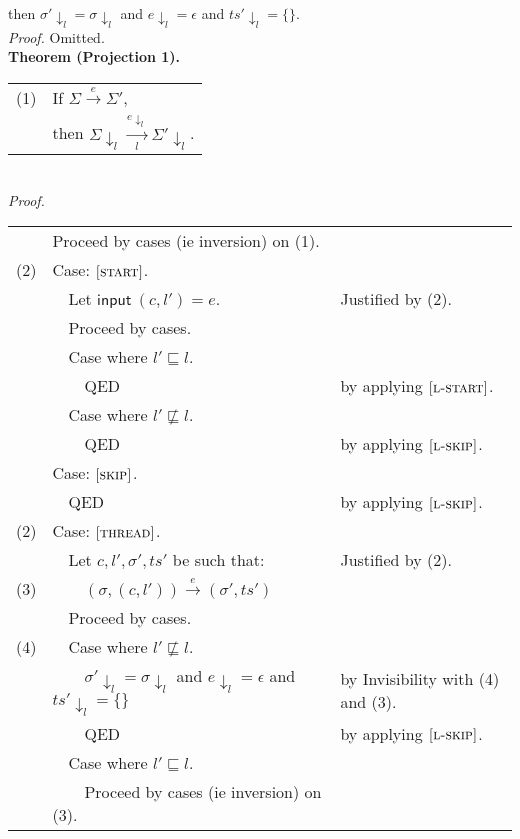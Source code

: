 \documentclass{article}
\newcommand{\rn}[1]{\text{\textsc{[#1]}}}
\newcommand{\tsteparrow}[1]{\overset{#1}{\longrightarrow}}
\newcommand{\tstep}[3]{#2\tsteparrow{#1}#3}
\newcommand{\ssteparrow}[1]{\overset{#1}{\longrightarrow}}
\newcommand{\sstep}[3]{#2\ssteparrow{#1}#3}
\newcommand{\lssteparrow}[2]{\overset{#2}{\underset{#1}{\longrightarrow}}}
\newcommand{\lsstep}[4]{#3\lssteparrow{#1}{#2}#4}
\newcommand{\thread}[2]{(#1,#2)}
\newcommand{\evstart}[1]{\textsf{input}~#1}
\newcommand{\proj}[2]{#1{\downarrow_{#2}}}
\begin{document}
\\
then $\proj{\sigma'}{l}=\proj{\sigma}{l}$
and $\proj{e}{l}=\epsilon$
and $\proj{ts'}{l}=\{\}$.
\\
\textit{Proof.}
Omitted.
\\
\textbf{Theorem (Projection 1).}
\\
\begin{tabular}{l@{$\qquad$}l}
  (1) & If $\sstep{e}{\Sigma}{\Sigma'}$,
\\
      & then $\lsstep{l}{\proj{e}{l}}{\proj{\Sigma}{l}}{\proj{\Sigma'}{l}}$.
\end{tabular}
\\
\textit{Proof.}
\\
\newcommand{\z}{$\quad$}
\begin{tabular}{l@{$\qquad$}l@{\qquad}l}
        & Proceed by cases (ie inversion) on (1).
\\
  (2)   & Case: $\rn{start}$.
\\
        & \z Let $\evstart{\thread{c}{l'}}=e$.
        & Justified by (2).
\\
        & \z Proceed by cases.
\\
        & \z Case where $l'\sqsubseteq l$.
\\
        & \z \z QED
        & by applying $\rn{l-start}$.
\\
        & \z Case where $l'\not\sqsubseteq l$.
\\
        & \z \z QED
        & by applying $\rn{l-skip}$.
\\
        & Case: $\rn{skip}$.
\\
        & \z QED
        & by applying $\rn{l-skip}$.
\\
  (2)   & Case: $\rn{thread}$.
\\
        & \z Let $c,l',\sigma',ts'$ be such that:
        & Justified by (2).
\\
  (3)   & \z \z $\tstep{e}{(\sigma,\thread{c}{l'})}{(\sigma',ts')}$
\\
        & \z Proceed by cases.
\\
  (4)   & \z Case where $l'\not\sqsubseteq l$.
\\
        & \z \z $\proj{\sigma'}{l}=\proj{\sigma}{l}$ and $\proj{e}{l}=\epsilon$ and $\proj{ts'}{l}=\{\}$
        & by Invisibility with (4) and (3).
\\
        & \z \z QED
        & by applying $\rn{l-skip}$.
\\
        & \z Case where $l'\sqsubseteq l$.
\\
        & \z \z Proceed by cases (ie inversion) on (3).

\end{tabular}
\end{document}
